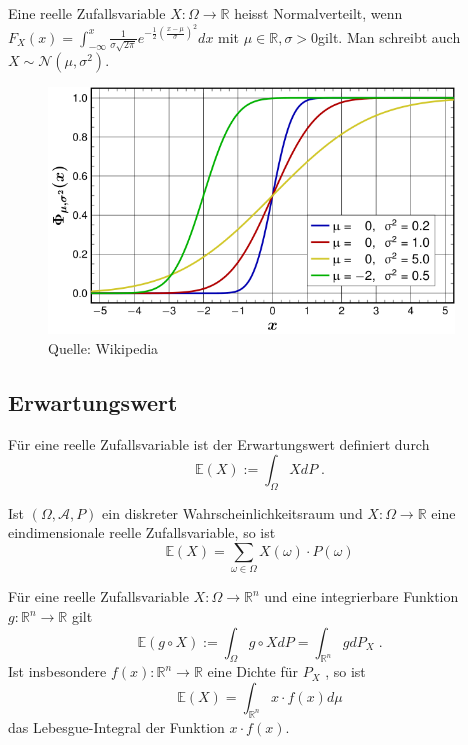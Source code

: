 \begin{Definition}[Normalverteilung]
Eine reelle Zufallsvariable $X: \Omega \to \mathbb{R}$ heisst Normalverteilt, wenn 
$F_X (x) = \int_{- \infty}^{x}  \frac 1{\sigma \sqrt{2\pi}}e^{- \frac {1}{2} (\frac{x- \mu}{ \sigma})^2}dx$ mit  $\mu \in \mathbb{R}, \sigma > 0 $gilt. Man schreibt auch $X \sim \mathcal{N}(\mu, \sigma^2)$.
\end{Definition}
\begin{figure}[htp]
      \centering
    \includegraphics[width=0.96\textwidth]{images/normal_distribution}
      \caption{Quelle: Wikipedia}
\end{figure}


\subsection{Erwartungswert}


\begin{Definition}
Für eine reelle Zufallsvariable ist der Erwartungswert definiert durch
$$ \mathbb{E} (X) := \int_{\Omega} X dP \; .$$
\end{Definition}




\begin{Bemerkung}
Ist $(\Omega, \mathcal{A}, P)$ ein diskreter Wahrscheinlichkeitsraum und $X :\Omega \to \mathbb{R}$ eine eindimensionale reelle Zufallsvariable, so ist
$$ \mathbb{E} (X) = \sum_{\omega \in \Omega}  X(\omega) \cdot P(\omega)$$
\end{Bemerkung}


\begin{Satz}
Für eine reelle Zufallsvariable $X: \Omega \to \mathbb{R}^n$ und eine integrierbare Funktion $g:  \mathbb{R}^n \to \mathbb{R}$ gilt
$$ \mathbb{E} (g \circ X) := \int_{\Omega} g \circ X dP = \int_{\mathbb{R}^n}  g  dP_X \;. $$
Ist insbesondere $f(x) : \mathbb{R}^n \to \mathbb{R}$ eine Dichte für $P_X$ , so ist  
$$\mathbb{E} (X) =  \int_{\mathbb{R}^n} x \cdot f(x) d\mu$$ das Lebesgue-Integral der Funktion $x \cdot f(x)$.

\end{Satz}

